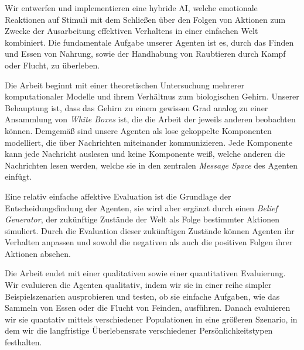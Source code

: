\documentclass[draft,final]{vutinfth}
\begin{document}
	\begin{kurzfassung}
		Wir entwerfen und implementieren eine hybride AI, welche emotionale Reaktionen auf Stimuli mit dem Schließen über den Folgen von Aktionen zum Zwecke der Ausarbeitung effektiven Verhaltens in einer einfachen Welt kombiniert. Die fundamentale Aufgabe unserer Agenten ist es, durch das Finden und Essen von Nahrung, sowie der Handhabung von Raubtieren durch Kampf oder Flucht, zu überleben.
		
		Die Arbeit beginnt mit einer theoretischen Untersuchung mehrerer komputationaler Modelle und ihrem Verhältnus zum biologischen Gehirn. Unserer Behauptung ist, dass das Gehirn zu einem gewissen Grad analog zu einer Ansammlung von \emph{White Boxes} ist, die die Arbeit der jeweils anderen beobachten können. Demgemäß sind unsere Agenten als lose gekoppelte Komponenten modelliert, die über Nachrichten miteinander kommunizieren. Jede Komponente kann jede Nachricht auslesen und keine Komponente weiß, welche anderen die Nachrichten lesen werden, welche sie in den zentralen \emph{Message Space} des Agenten einfügt.
		
		Eine relativ einfache affektive Evaluation ist die Grundlage der Entscheidungsfindung der Agenten, sie wird aber ergänzt durch einen \emph{Belief Generator}, der zukünftige Zustände der Welt als Folge bestimmter Aktionen simuliert. Durch die Evaluation dieser zukünftigen Zustände können Agenten ihr Verhalten anpassen und sowohl die negativen als auch die positiven Folgen ihrer Aktionen absehen.
		
		Die Arbeit endet mit einer qualitativen sowie einer quantitativen Evaluierung. Wir evaluieren die Agenten qualitativ, indem wir sie in einer reihe simpler Beispielszenarien ausprobieren und testen, ob sie einfache Aufgaben, wie das Sammeln von Essen oder die Flucht von Feinden, ausführen. Danach evaluieren wir sie quantativ mittels verschiedener Populationen in eine größeren Szenario, in dem wir die langfristige Überlebensrate verschiedener Persönlichkeitstypen festhalten.
	\end{kurzfassung}
	
	
	\tableofcontents %
	
	\mainmatter
	
\end{document}
